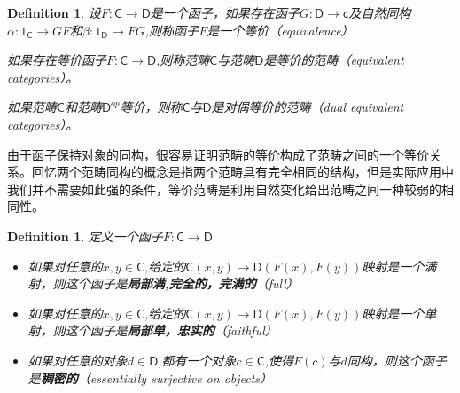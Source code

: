 \documentclass[UTF8,11pt,a4paper]{ctexart}
\newtheorem{definition}[theorem]{Definition}
\newcommand{\tbf}{\textbf}
\newcommand*{\cat}[1]{\textsf{#1}\xspace}
\newcommand{\al}{\alpha}
\newcommand{\be}{\beta}
\newcommand*{\xfunc}[4]{{#2}\colon{#3}{#1}{#4}}
\newcommand*{\func}[3]{\xfunc{\to}{#1}{#2}{#3}}
\begin{document}
\begin{definition}
设$\func{F}{\cat{C}}{\cat{D}}$是一个函子，如果存在函子$\func{G}{\cat{D}}{\cat{c}}$及自然同构$\func{\al}{1_{\cat{C}}}{GF}$和$\func{\be}{1_{\cat{D}}}{FG}$,则称函子$F$是一个等价（equivalence）

\begin{center}
\end{center}


如果存在等价函子$\func{F}{\cat{C}}{\cat{D}}$,则称范畴$\cat{C}$与范畴$\cat{D}$是等价的范畴（equivalent categories）。

如果范畴$\cat{C}$和范畴$\cat{D}^{op}$等价，则称$\cat{C}$与$\cat{D}$是对偶等价的范畴（dual equivalent categories）。
\end{definition}

由于函子保持对象的同构，很容易证明范畴的等价构成了范畴之间的一个等价关系。回忆两个范畴同构的概念是指两个范畴具有完全相同的结构，但是实际应用中我们并不需要如此强的条件，等价范畴是利用自然变化给出范畴之间一种较弱的相同性。

\begin{definition}
定义一个函子$\func{F}{\cat{C}}{\cat{D}}$
	\begin{itemize}
		\item 如果对任意的$x,y \in \cat{C}$,给定的$\cat{C}(x,y) \rightarrow \cat{D}(F(x),F(y))$映射是一个满射，则这个函子是\tbf{局部满,完全的，完满的}（full）
		\item 如果对任意的$x,y \in \cat{C}$,给定的$\cat{C}(x,y) \rightarrow \cat{D}(F(x),F(y))$映射是一个单射，则这个函子是\tbf{局部单，忠实的}（faithful）
		\item 如果对任意的对象$d \in \cat{D}$,都有一个对象$c \in \cat{C}$,使得$F(c)$与$d$同构，则这个函子是\tbf{稠密的}（essentially surjective on objects）
	\end{itemize}
\end{definition}
\end{document}
